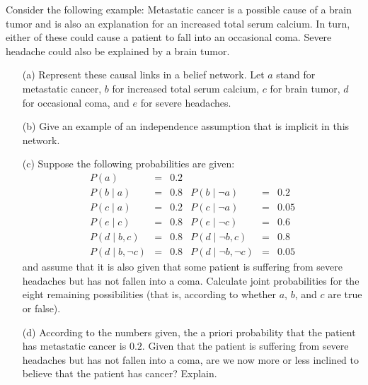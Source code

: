 \documentclass[a4paper, 11pt]{article}
\begin{document}
\begin{question}\normalfont
Consider the following example: Metastatic cancer is a possible cause of a brain tumor and is also an explanation for an increased total serum calcium. In turn, either of these could cause a patient to fall into an occasional coma. Severe headache could also be explained by a brain tumor.
\begin{itemize}
    \item [(a)] Represent these causal links in a belief network. Let $a$ stand for metastatic cancer, $b$ for increased total serum calcium, $c$ for brain tumor, $d$ for occasional coma, and $e$ for severe headaches.
    \item [(b)] Give an example of an independence assumption that is implicit in this network.
    \item [(c)] Suppose the following probabilities are given:
\[\begin{array}{rllrll}
{P(a)} & {=} & {0.2} & {} \\
{P(b \mid a)} & {=} & {0.8} & {P(b \mid \neg a)} & {=} & {0.2} \\
{P(c \mid a)} & {=} & {0.2} & {P(c \mid \neg a)} & {=} & {0.05} \\
{P(e \mid c)} & {=} & {0.8} & {P(e \mid \neg c)} & {=} & {0.6} \\
{P(d \mid b, c)} & {=} & {0.8} & {P(d \mid \neg b, c)} & {=} & {0.8} \\
{P(d \mid b, \neg c)} & {=} & {0.8} & {P(d \mid \neg b, \neg c)} & {=} & {0.05}
\end{array}\]
    and assume that it is also given that some patient is suffering from severe headaches but has not fallen into a coma. Calculate joint probabilities for the eight remaining possibilities (that is, according to whether $a$, $b$, and $c$ are true or false).
    \item [(d)] According to the numbers given, the a priori probability that the patient has metastatic cancer is $0.2$. Given that the patient is suffering from severe headaches but has not fallen into a coma, are we now more or less inclined to believe that the patient has cancer? Explain.
\end{itemize}
\end{question}
\end{document}
